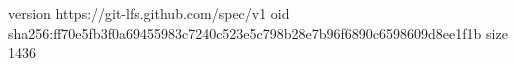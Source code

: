 version https://git-lfs.github.com/spec/v1
oid sha256:ff70e5fb3f0a69455983c7240c523e5c798b28e7b96f6890c6598609d8ee1f1b
size 1436
